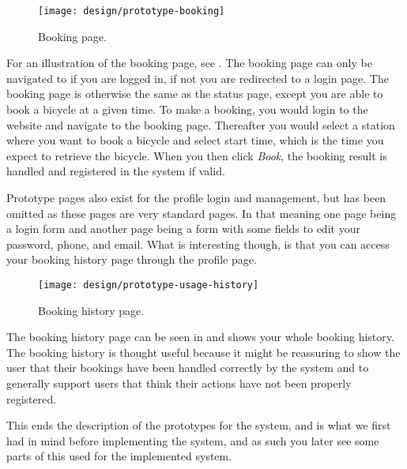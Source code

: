 \begin{figure}[h]
	\centering
	\texttt{[image: design/prototype-booking]}
	\caption{Booking page.}\label{fig:prototype-book}
\end{figure}

For an illustration of the booking page, see .
The booking page can only be navigated to if you are logged in, if not you are redirected to a login page.
The booking page is otherwise the same as the status page, except you are able to book a bicycle at a given time.
To make a booking, you would login to the website and navigate to the booking page.
Thereafter you would select a station where you want to book a bicycle and select start time, which is the time you expect to retrieve the bicycle.
When you then click \textit{Book}, the booking result is handled and registered in the system if valid.

Prototype pages also exist for the profile login and management, but has been omitted as these pages are very standard pages.
In that meaning one page being a login form and another page being a form with some fields to edit your password, phone, and email.
What is interesting though, is that you can access your booking history page through the profile page.

\begin{figure}[h]
	\centering
	\texttt{[image: design/prototype-usage-history]}
	\caption{Booking history page.}\label{fig:prototype-usage-history}
\end{figure}

The booking history page can be seen in  and shows your whole booking history.
The booking history is thought useful because it might be reassuring to show the user that their bookings have been handled correctly by the system and to generally support users that think their actions have not been properly registered.

This ends the description of the prototypes for the system, and is what we first had in mind before implementing the system, and as such you later see some parts of this used for the implemented system.